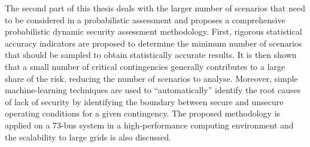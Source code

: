 The second part of this thesis deals with the larger number of scenarios that need to be considered in a probabilistic assessment and proposes a comprehensive probabilistic dynamic security assessment methodology. First, rigorous statistical accuracy indicators are proposed to determine the minimum number of scenarios that should be sampled to obtain statistically accurate results. It is then shown that a small number of critical contingencies generally contributes to a large share of the risk, reducing the number of scenarios to analyse. Moreover, simple machine-learning techniques are used to ``automatically'' identify the root causes of lack of security by identifying the boundary between secure and unsecure operating conditions for a given contingency. The proposed methodology is applied on a 73-bus system in a high-performance computing environment and the scalability to large grids is also discussed.
